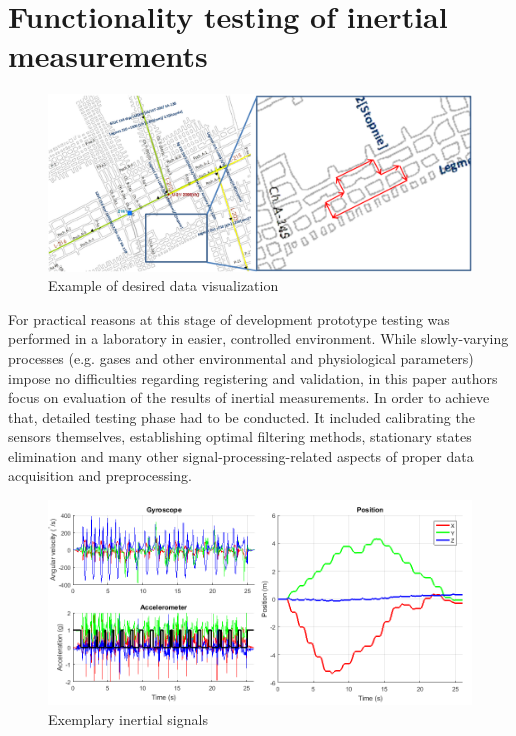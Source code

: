 \documentclass[10pt, a4paper]{article}
\begin{document}
\section{Functionality testing of inertial measurements}\label{s:func}

\begin{figure}[ht!]
    \centering
    \includegraphics[width=\textwidth]{fig/map2.png}
    \caption{Example of desired data visualization}
    \label{fig:map}
\end{figure}

For practical reasons at this stage of development prototype testing was performed in a laboratory in easier, controlled environment. While slowly-varying processes (e.g. gases and other environmental and physiological parameters) impose no difficulties regarding registering and validation, in this paper authors focus on evaluation of the results of inertial measurements. In order to achieve that, detailed testing phase had to be conducted. It included calibrating the sensors themselves, establishing optimal filtering methods, stationary states elimination and many other signal-processing-related aspects of proper data acquisition and preprocessing. 

\begin{figure}[ht!]
    \centering
    \includegraphics[width=.9\textwidth]{fig/IMUsignals.png}
    \caption{Exemplary inertial signals}
    \label{fig:sig}
\end{figure} 
\end{document}
